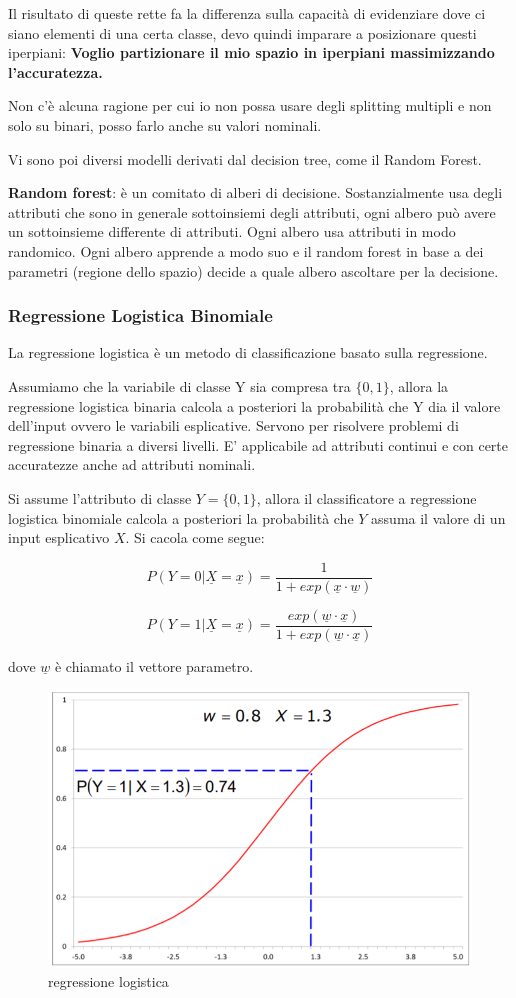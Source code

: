 Il risultato di queste rette fa la differenza sulla capacità di evidenziare dove ci siano elementi di una certa classe, devo quindi imparare a posizionare questi iperpiani: \textbf{Voglio partizionare il mio spazio in iperpiani massimizzando l'accuratezza.}

Non c'è alcuna ragione per cui io non possa usare degli splitting multipli e non solo su binari, posso farlo anche su valori nominali.

Vi sono poi diversi modelli derivati dal decision tree, come il Random Forest.

\textbf{Random forest}: \`e un comitato di alberi di decisione. Sostanzialmente usa degli attributi che sono in generale sottoinsiemi degli attributi, ogni albero può avere un sottoinsieme differente di attributi. Ogni albero usa attributi in modo randomico. Ogni albero apprende a modo suo e il random forest in base a dei parametri (regione dello spazio) decide a quale albero ascoltare per la decisione.

\subsubsection{Regressione Logistica Binomiale}
La regressione logistica è un metodo di classificazione basato sulla regressione.

Assumiamo che la variabile di classe Y sia compresa tra $\{0,1\}$, allora la regressione logistica binaria calcola a posteriori la probabilità che Y dia il valore dell'input ovvero le variabili esplicative.
Servono per risolvere problemi di regressione binaria a diversi livelli. E' applicabile ad attributi continui e con certe accuratezze anche ad attributi nominali.

Si assume l'attributo di classe $Y = \{0,1\}$, allora il classificatore a regressione logistica binomiale calcola a posteriori la probabilit\`a che $Y$ assuma il valore di un input esplicativo \underline{$X$}. Si cacola come segue:

\[P(Y = 0 | \underline{X}= \underline{x}) = \frac{1}{1+exp(\underline{x} \cdot \underline{w})}\]

\[P(Y = 1 | \underline{X}= \underline{x}) = \frac{exp(\underline{w} \cdot \underline{x})}{1+exp(\underline{w} \cdot \underline{x})}\]

dove $\underline{w}$ \`e chiamato il vettore parametro.

\begin{figure}[H]
	\centering
	\includegraphics[height=0.5 \linewidth]{classification/pict/regr_logistic.png}
	\caption{regressione logistica}
\end{figure}

